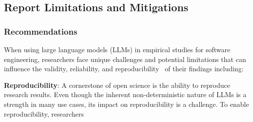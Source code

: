 



\subsection{Report Limitations and Mitigations}

\subsubsection{Recommendations}
When using large language models (LLMs) in empirical studies for software engineering, researchers face unique challenges and potential limitations that can influence the validity, reliability, and reproducibility~\cite{sallou2024breaking} of their findings including:

\textbf{Reproducibility}:
A cornerstone of open science is the ability to reproduce research results. Even though the inherent non-deterministic nature of LLMs is a strength in many use cases, its impact on reproducibility is a challenge. To enable reproducibility, researchers 

